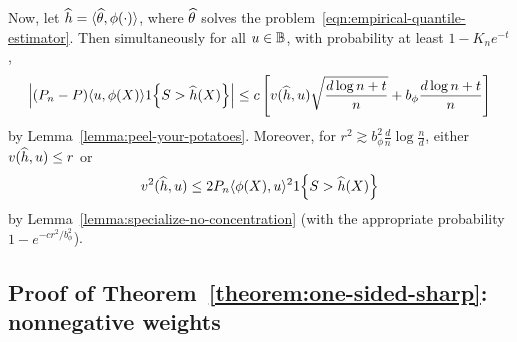 \documentclass[11pt]{article}
\newcommand{\radphi}{b_{\phi}}
\newcommand{\scorerv}{S}
\begin{document}
Now, let $\widehat{h} = \langle\widehat{\theta}, \phi(\cdot)\rangle$, where $\widehat{\theta}$
solves the problem~\eqref{eqn:empirical-quantile-estimator}.
%
Then simultaneously for all $u \in \mathbb{B}$,
with probability at least $1 - K_n e^{-t}$,
\begin{equation}
  \label{eqn:bart-ride}
  \left|(P_n - P)\<u, \phi(X)\> \indic{\scorerv > \what{h}(X)}\right|
  \le c \left[v(\what{h}, u)
    \sqrt{\frac{d \log n + t}{n}}
    + \radphi \frac{d \log n + t}{n}\right]
\end{equation}
by Lemma~\ref{lemma:peel-your-potatoes}.
Moreover, for $r^2 \gtrsim \radphi^2 \frac{d}{n} \log \frac{n}{d}$,
either $v(\widehat{h}, u) \le r$ or
\begin{equation*}
  v^2(\what{h}, u)
  \le 2 P_n \<\phi(X), u\>^2 \indic{\scorerv > \what{h}(X)}
\end{equation*}
by Lemma~\ref{lemma:specialize-no-concentration} (with the appropriate
probability $1 - e^{-cr^2 / \radphi^2}$).

\subsection{Proof of Theorem~\ref{theorem:one-sided-sharp}: nonnegative
  weights}
\label{sec:proof-one-sided-sharp}
\end{document}
